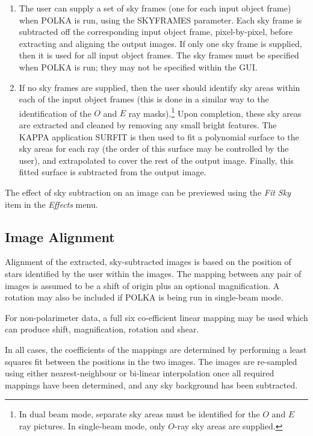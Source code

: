 \documentclass[11pt]{article}
\newcommand{\htmlref}[2]{#1}
\newcommand{\xref}[3]{#1}
\newcommand{\xlabel}[1]{}
\newcommand{\mylabel}[1] {\xlabel{#1}\label{#1}}
\begin{document}
\begin{enumerate}

\item The user can supply a set of sky frames (one for each input object
frame) when POLKA is run, using the SKYFRAMES parameter. Each sky
frame is subtracted off the corresponding input object frame,
pixel-by-pixel, before extracting and aligning the output images. If only
one sky frame is supplied, then it is used for all input object frames.
The sky frames must be specified when POLKA is run; they may not be
specified within the GUI.

\item If no sky frames are supplied, then the user should identify sky areas
within each of the input object frames (this is done in a similar way to
the identification of the $O$ and $E$ ray masks).\footnote{In dual beam
mode, separate sky areas must be identified for the $O$ and $E$ ray
pictures. In single-beam mode, only $O$-ray sky areas are supplied.}
Upon completion, these sky areas are extracted and cleaned by removing
any small bright features. The \xref{KAPPA}{sun95}{} application
\xref{SURFIT}{sun95}{SURFIT} is then used to fit a polynomial surface
to the sky areas for each ray (the order of this surface may be controlled
by the user), and extrapolated to cover the rest of the output image.
Finally, this fitted surface is subtracted from the output image.

\end{enumerate}

The effect of sky subtraction on an image can be previewed using the
\htmlref{\emph{Fit Sky}}{POLKA_FITSKY_EFFECT} item in the
\htmlref{\emph{Effects}}{POLKA_EFFECTS_MENU} menu.

\subsection{\mylabel{POLKA_ALIGNMENT}Image Alignment}
Alignment of the extracted, sky-subtracted images is based on the
position of stars identified by the user within the images. The mapping
between any pair of images is assumed to be a shift of origin plus an
optional magnification. A rotation may also be included if POLKA is being
run in single-beam mode.

For non-polarimeter data, a full six co-efficient linear mapping may be
used which can produce shift, magnification, rotation and shear.

In all cases, the coefficients of the mappings are determined by
performing a least squares fit between the positions in the two images.
The images are re-sampled using either nearest-neighbour or bi-linear
interpolation once all required mappings have been determined, and any
sky background has been subtracted.
\end{document}
